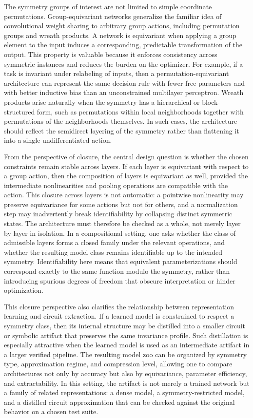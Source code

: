 \documentclass[11pt]{article}
\begin{document}
The symmetry groups of interest are not limited to simple coordinate permutations. Group-equivariant networks generalize the familiar idea of convolutional weight sharing to arbitrary group actions, including permutation groups and wreath products. A network is equivariant when applying a group element to the input induces a corresponding, predictable transformation of the output. This property is valuable because it enforces consistency across symmetric instances and reduces the burden on the optimizer. For example, if a task is invariant under relabeling of inputs, then a permutation-equivariant architecture can represent the same decision rule with fewer free parameters and with better inductive bias than an unconstrained multilayer perceptron. Wreath products arise naturally when the symmetry has a hierarchical or block-structured form, such as permutations within local neighborhoods together with permutations of the neighborhoods themselves. In such cases, the architecture should reflect the semidirect layering of the symmetry rather than flattening it into a single undifferentiated action.

From the perspective of closure, the central design question is whether the chosen constraints remain stable across layers. If each layer is equivariant with respect to a group action, then the composition of layers is equivariant as well, provided the intermediate nonlinearities and pooling operations are compatible with the action. This closure across layers is not automatic: a pointwise nonlinearity may preserve equivariance for some actions but not for others, and a normalization step may inadvertently break identifiability by collapsing distinct symmetric states. The architecture must therefore be checked as a whole, not merely layer by layer in isolation. In a compositional setting, one asks whether the class of admissible layers forms a closed family under the relevant operations, and whether the resulting model class remains identifiable up to the intended symmetry. Identifiability here means that equivalent parameterizations should correspond exactly to the same function modulo the symmetry, rather than introducing spurious degrees of freedom that obscure interpretation or hinder optimization.

This closure perspective also clarifies the relationship between representation learning and circuit extraction. If a learned model is constrained to respect a symmetry class, then its internal structure may be distilled into a smaller circuit or symbolic artifact that preserves the same invariance profile. Such distillation is especially attractive when the learned model is used as an intermediate artifact in a larger verified pipeline. The resulting model zoo can be organized by symmetry type, approximation regime, and compression level, allowing one to compare architectures not only by accuracy but also by equivariance, parameter efficiency, and extractability. In this setting, the artifact is not merely a trained network but a family of related representations: a dense model, a symmetry-restricted model, and a distilled circuit approximation that can be checked against the original behavior on a chosen test suite.
\end{document}
